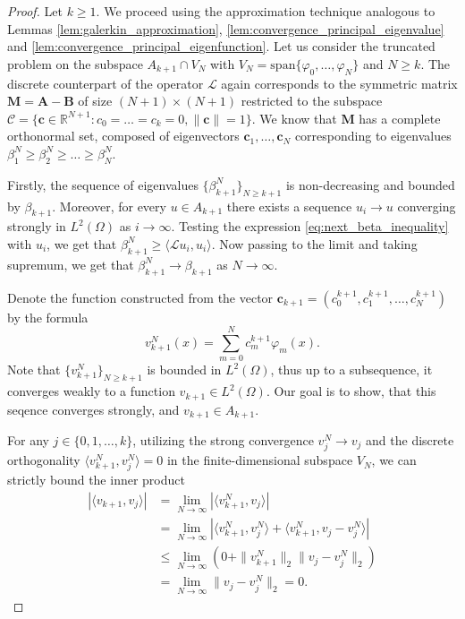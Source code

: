 \documentclass[12pt, a4paper]{article}
\theoremstyle{break}
\theoremstyle{break}
\theoremstyle{break}
\theoremstyle{break}
\theoremstyle{break}
\theoremstyle{break}
\theoremstyle{break}
\theoremstyle{break}
\theoremstyle{break}
\begin{document}
\begin{proof}
    Let $k \geq 1$. We proceed using the approximation technique analogous to Lemmas \ref{lem:galerkin_approximation}, \ref{lem:convergence_principal_eigenvalue} and \ref{lem:convergence_principal_eigenfunction}. Let us consider the truncated problem on the subspace $A_{k+1} \cap V_N$ with $V_N = \text{span}\{\varphi_0, \ldots, \varphi_N\}$ and $N \geq k$. The discrete counterpart of the operator $\mathcal{L}$ again corresponds to the symmetric matrix $\mathbf{M} = \mathbf{A} - \mathbf{B}$ of size $(N+1) \times (N+1)$ restricted to the subspace $\mathcal{C} = \{ \mathbf{c} \in \mathbb{R}^{N+1} : c_0 = \ldots = c_k = 0, \|\mathbf{c}\| = 1\}$. We know that $\mathbf{M}$ has a complete orthonormal set, composed of eigenvectors $\mathbf{c}_1, \ldots, \mathbf{c}_N$ corresponding to eigenvalues $\beta_1^N \geq \beta_2^N \geq \ldots \geq \beta_N^N$. 

    Firstly, the sequence of eigenvalues $\{\beta_{k+1}^N\}_{N \geq k+1}$ is non-decreasing and bounded by $\beta_{k+1}$. Moreover, for every $u \in A_{k+1}$ there exists a sequence $u_i \rightarrow u$ converging strongly in $L^2(\Omega)$ as $i \rightarrow \infty$. Testing the expression \ref{eq:next_beta_inequality} with $u_i$, we get that $\beta_{k+1}^N \geq \langle \mathcal{L} u_i, u_i \rangle$. Now passing to the limit and taking supremum, we get that
    $\beta_{k+1}^N \rightarrow \beta_{k+1}$ as $N \rightarrow \infty$.
    
    Denote the function constructed from the vector $\mathbf{c}_{k+1} = (c_0^{k+1}, c_1^{k+1}, \ldots, c_N^{k+1})$ by the formula
    \begin{equation}
        v_{k+1}^N(x) = \sum_{m=0}^N c^{k+1}_m \varphi_m(x).
    \end{equation}
    Note that $\{v_{k+1}^N\}_{N \geq k+1}$ is bounded in $L^2(\Omega)$, thus up to a subsequence, it converges weakly to a function $v_{k+1} \in L^2(\Omega)$. Our goal is to show, that this seqence converges strongly, and $v_{k+1} \in A_{k+1}$.

    For any $j \in \{0, 1, \ldots, k\}$, utilizing the strong convergence $v_j^N \to v_j$ and the discrete orthogonality $\langle v_{k+1}^N, v_j^N \rangle = 0$ in the finite-dimensional subspace $V_N$, we can strictly bound the inner product
    \begin{align}
        |\langle v_{k+1} , v_j \rangle| &= \lim_{N \rightarrow \infty} |\langle v_{k+1}^N, v_j \rangle| \nonumber \\
        &= \lim_{N \rightarrow \infty} |\langle v_{k+1}^N, v_j^N \rangle + \langle v_{k+1}^N, v_j - v_j^N \rangle| \nonumber \\
        &\leq \lim_{N \rightarrow \infty} \left( 0 + \|v_{k+1}^N\|_2 \|v_j - v_j^N\|_2 \right) \\
        &= \lim_{N \rightarrow \infty} \|v_j - v_j^N\|_2 = 0. \nonumber
    \end{align}
    

\end{proof}
\end{document}
